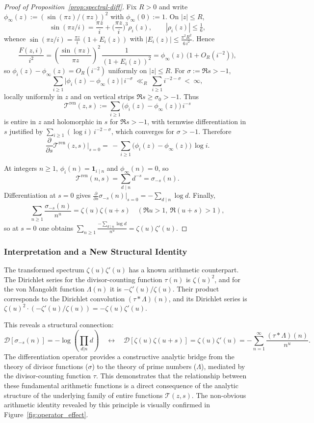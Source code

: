 \begin{proof}[Proof of Proposition~\ref{prop:spectral-diff}]
Fix $R>0$ and write $\phi_\infty(z):=(\sin(\pi z)/(\pi z))^2$ with $\phi_\infty(0):=1$. On $|z|\le R$,
\[
\sin(\pi z/i)=\frac{\pi z}{i}+\Big(\frac{\pi z}{i}\Big)^3 \rho_i(z),\qquad |\rho_i(z)|\le \tfrac{1}{6},
\]
whence $\sin(\pi z/i)=\frac{\pi z}{i}\,(1+E_i(z))$ with $|E_i(z)|\le \frac{\pi^2 R^2}{6\,i^{2}}$. Hence
\[
\frac{F(z,i)}{i^2}
=\left(\frac{\sin(\pi z)}{\pi z}\right)^{\!2}\,\frac{1}{(1+E_i(z))^{2}}
=\phi_\infty(z)\,\big(1+O_R(i^{-2})\big),
\]
so $\phi_i(z)-\phi_\infty(z)=O_R(i^{-2})$ uniformly on $|z|\le R$. For $\sigma:=\Re s>-1$,
\[
\sum_{i\ge1}\big|\phi_i(z)-\phi_\infty(z)\big|\,i^{-\sigma}\ \ll_R\ \sum_{i\ge1}i^{-2-\sigma}\ <\ \infty,
\]
locally uniformly in $z$ and on vertical strips $\Re s\ge \sigma_0>-1$. Thus
\[
\mathcal T^{\mathrm{ren}}(z,s):=\sum_{i\ge1}\big(\phi_i(z)-\phi_\infty(z)\big)\,i^{-s}
\]
is entire in $z$ and holomorphic in $s$ for $\Re s>-1$, with termwise differentiation in $s$ justified by $\sum_{i\ge1}(\log i)\,i^{-2-\sigma}$, which converges for $\sigma>-1$. Therefore
\[
\frac{\partial}{\partial s}\mathcal T^{\mathrm{ren}}(z,s)\Big|_{s=0}
=\,-\sum_{i\ge1}\bigl(\phi_i(z)-\phi_\infty(z)\bigr)\,\log i.
\]

At integers $n\ge1$, $\phi_i(n)=\mathbf 1_{i\mid n}$ and $\phi_\infty(n)=0$, so
\[
\mathcal T^{\mathrm{ren}}(n,s)=\sum_{d\mid n}d^{-s}=\sigma_{-s}(n).
\]
Differentiation at $s=0$ gives $\frac{\partial}{\partial s}\sigma_{-s}(n)|_{s=0}=-\sum_{d\mid n}\log d$. Finally,
\[
\sum_{n\ge1}\frac{\sigma_{-s}(n)}{n^u}=\zeta(u)\zeta(u+s)
\quad(\Re u>1,\ \Re(u+s)>1),
\]
so at $s=0$ one obtains $\sum_{n\ge1}\frac{-\sum_{d\mid n}\log d}{n^u}=\zeta(u)\zeta'(u)$.
\end{proof}

\subsubsection{Interpretation and a New Structural Identity}
The transformed spectrum $\zeta(u)\zeta'(u)$ has a known arithmetic counterpart. The Dirichlet series for the divisor-counting function $\tau(n)$ is $\zeta(u)^2$, and for the von Mangoldt function $\Lambda(n)$ it is $-\zeta'(u)/\zeta(u)$. Their product corresponds to the Dirichlet convolution $(\tau * \Lambda)(n)$, and its Dirichlet series is $\zeta(u)^2 \cdot (-\zeta'(u)/\zeta(u)) = -\zeta(u)\zeta'(u)$.

This reveals a structural connection:
\[
\mathcal{D}[\sigma_{-s}(n)] = -\log\left(\prod_{d|n} d\right) \quad \longleftrightarrow \quad \mathcal{D}[\zeta(u)\zeta(u+s)] = \zeta(u)\zeta'(u) = - \sum_{n=1}^\infty \frac{(\tau * \Lambda)(n)}{n^u}.
\]
The differentiation operator provides a constructive analytic bridge from the theory of divisor functions ($\sigma$) to the theory of prime numbers ($\Lambda$), mediated by the divisor-counting function $\tau$. This demonstrates that the relationship between these fundamental arithmetic functions is a direct consequence of the analytic structure of the underlying family of entire functions $\mathcal{T}(z,s)$. The non-obvious arithmetic identity revealed by this principle is visually confirmed in Figure~\ref{fig:operator_effect}.

